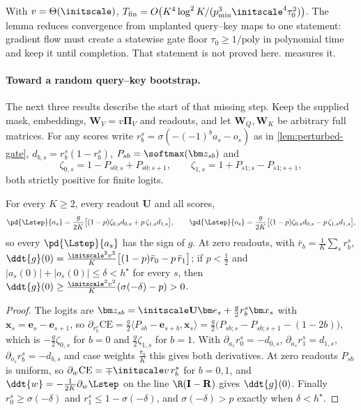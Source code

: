 With $v=\Theta(\initscale)$, $T_{\mathrm{fin}}=O\bigl(K^4\log^2K/(p_{\min}^3\initscale^4\tau_0^2)\bigr)$. The lemma reduces convergence from unplanted query--key
maps to one statement: gradient flow must create a statewise gate floor $\tau_0\ge1/\mathrm{poly}$ in polynomial time and keep it until
completion. That statement is not proved here.  measures it.

\paragraph{Toward a random query--key bootstrap.} The next three results describe the start of that missing step. Keep the
supplied mask, embeddings, $\mathbf W_V=v\bm\Pi_V$ and readouts, and let $\mathbf W_Q,\mathbf W_K$ be arbitrary full matrices. For any scores write
$r^s_b=\sigma(-(-1)^ba_s-o_s)$ as in \cref{lem:perturbed-gate}, $d_{b,s}=r^s_b(1-r^s_b)$, $P_{sb}=\softmax(\bm z_{sb})$ and
\[
 \zeta_{0,s}=1-P_{s0;s}+P_{s0;s+1},\qquad \zeta_{1,s}=1+P_{s1;s}-P_{s1;s+1},
\]
both strictly positive for finite logits.

\begin{lemma}
\label{lem:score-direction}
For every $K\ge2$, every readout $\mathbf U$ and all scores,
\[
 \pd{\Lstep}{a_s}=\frac{g}{2K}\bigl[(1-p)\zeta_{0,s}d_{0,s}+p\,\zeta_{1,s}d_{1,s}\bigr],\qquad
 \pd{\Lstep}{o_s}=\frac{g}{2K}\bigl[(1-p)\zeta_{0,s}d_{0,s}-p\,\zeta_{1,s}d_{1,s}\bigr],
\]
so every $\pd{\Lstep}{a_s}$ has the sign of $g$. At zero readouts, with $\bar r_b=\frac1K\sum_sr^s_b$,
$\ddt{g}(0)=\frac{\initscale^2v^2}{K}\bigl[(1-p)\bar r_0-p\,\bar r_1\bigr]$; if $p<\frac12$ and $|a_s(0)|+|o_s(0)|\le\delta<h^\star$ for every $s$, then
$\ddt{g}(0)\ge\frac{\initscale^2v^2}{K}(\sigma(-\delta)-p)>0$.
\end{lemma}

\begin{proof}
The logits are $\bm z_{sb}=\initscale\mathbf U\bm e_s+\frac g2r^s_b\bm x_s$ with $\bm x_s=\bm e_s-\bm e_{s+1}$, so
$\partial_{r^s_b}\mathrm{CE}=\frac g2\langle P_{sb}-\bm e_{s+b},\bm x_s\rangle=\frac g2\bigl(P_{sb;s}-P_{sb;s+1}-(1-2b)\bigr)$, which is $-\frac g2\zeta_{0,s}$ for
$b=0$ and $\frac g2\zeta_{1,s}$ for $b=1$. With $\partial_{a_s}r^s_0=-d_{0,s}$, $\partial_{a_s}r^s_1=d_{1,s}$, $\partial_{o_s}r^s_b=-d_{b,s}$ and case weights
$\frac{\pi_b}K$ this gives both derivatives. At zero readouts $P_{sb}$ is uniform, so $\partial_w\mathrm{CE}=\mp\initscale v\,r^s_b$ for $b=0,1$, and
$\ddt{w}=-\frac1{2K}\partial_w\Lstep$ on the line $\R(\mathbf I-\mathbf R)$ gives $\ddt{g}(0)$. Finally $r^s_0\ge\sigma(-\delta)$ and $r^s_1\le1-\sigma(-\delta)$, and
$\sigma(-\delta)>p$ exactly when $\delta<h^\star$.
\end{proof}


